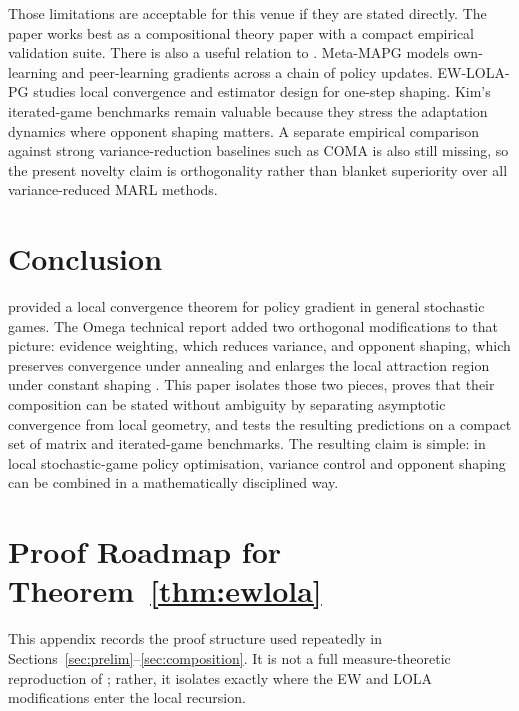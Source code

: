 \documentclass{article}
\theoremstyle{plain}
\theoremstyle{definition}
\theoremstyle{remark}
\begin{document}
Those limitations are acceptable for this venue if they are stated directly. The paper works best as a compositional theory paper with a compact empirical validation suite. There is also a useful relation to \citet{kim2021meta}. Meta-MAPG models own-learning and peer-learning gradients across a chain of policy updates. EW-LOLA-PG studies local convergence and estimator design for one-step shaping. Kim's iterated-game benchmarks remain valuable because they stress the adaptation dynamics where opponent shaping matters. A separate empirical comparison against strong variance-reduction baselines such as COMA is also still missing, so the present novelty claim is orthogonality rather than blanket superiority over all variance-reduced MARL methods.

\section{Conclusion}

\citet{giannou2022convergence} provided a local convergence theorem for policy gradient in general stochastic games. The Omega technical report added two orthogonal modifications to that picture: evidence weighting, which reduces variance, and opponent shaping, which preserves convergence under annealing and enlarges the local attraction region under constant shaping \citep{shcherbinin2026omega}. This paper isolates those two pieces, proves that their composition can be stated without ambiguity by separating asymptotic convergence from local geometry, and tests the resulting predictions on a compact set of matrix and iterated-game benchmarks. The resulting claim is simple: in local stochastic-game policy optimisation, variance control and opponent shaping can be combined in a mathematically disciplined way.

\appendix

\section{Proof Roadmap for Theorem~\ref{thm:ewlola}}\label{app:proof}

This appendix records the proof structure used repeatedly in Sections~\ref{sec:prelim}--\ref{sec:composition}. It is not a full measure-theoretic reproduction of \citet{giannou2022convergence}; rather, it isolates exactly where the EW and LOLA modifications enter the local recursion.
\end{document}

